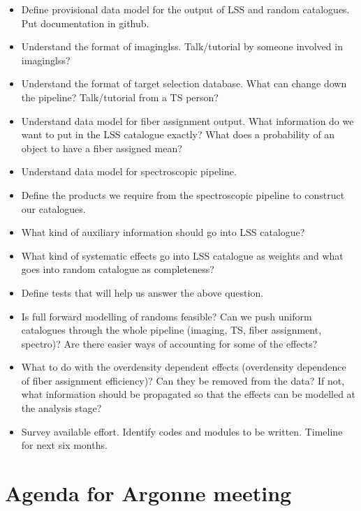 \documentclass[11pt]{article}
\begin{document}
\begin{itemize}
\item Define provisional data model for the output of LSS and random catalogues.
Put documentation in github.
\item Understand the format of imaginglss. Talk/tutorial by someone involved in
imaginglss?
\item Understand the format of target selection database. What can change down
the pipeline? Talk/tutorial from a TS person?
\item Understand data model for fiber assignment output. What information do we
want to put in the LSS catalogue exactly? What does a probability of an object
to have a fiber assigned mean?
\item Understand data model for spectroscopic pipeline.
\item Define the products we require from the spectroscopic pipeline to construct our catalogues.
\item What kind of auxiliary information should go into LSS catalogue?
\item What kind of systematic effects go into LSS catalogue as weights and what
goes into random catalogue as completeness?
\item Define tests that will help us answer the above question.
\item Is full forward modelling of randoms feasible? Can we push uniform
catalogues through the whole pipeline (imaging, TS, fiber assignment, spectro)?
Are there easier ways of accounting for some of the effects?
\item What to do with the overdensity dependent effects (overdensity dependence
of fiber assignment efficiency)? Can they be removed from the data? If not, what
information should be propagated so that the effects can be modelled at the
analysis stage?
\item Survey available effort. Identify codes and modules to be written.
Timeline for next six months.
\end{itemize}

\section{Agenda for Argonne meeting}
\end{document}
